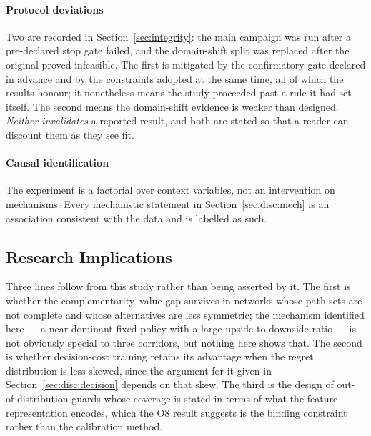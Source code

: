 \paragraph{Protocol deviations} Two are recorded in Section~\ref{sec:integrity}:
the main campaign was run after a pre-declared stop gate failed, and the
domain-shift split was replaced after the original proved infeasible. The first is
mitigated by the confirmatory gate declared in advance and by the constraints
adopted at the same time, all of which the results honour; it nonetheless means
the study proceeded past a rule it had set itself. The second means the
domain-shift evidence is weaker than designed. \emph{Neither invalidates} a
reported result, and both are stated so that a reader can discount them as they
see fit.

\paragraph{Causal identification} The experiment is a factorial over context
variables, not an intervention on mechanisms. Every mechanistic statement in
Section~\ref{sec:disc:mech} is an association consistent with the data and is
labelled as such.

\subsection{Research Implications}
\label{sec:disc:research}

Three lines follow from this study rather than being asserted by it. The first is
whether the complementarity--value gap survives in networks whose path sets are
not complete and whose alternatives are less symmetric; the mechanism identified
here --- a near-dominant fixed policy with a large upside-to-downside ratio --- is
not obviously special to three corridors, but nothing here shows that. The second
is whether decision-cost training retains its advantage when the regret
distribution is less skewed, since the argument for it given in
Section~\ref{sec:disc:decision} depends on that skew. The third is the design of
out-of-distribution guards whose coverage is stated in terms of what the feature
representation encodes, which the O8 result suggests is the binding constraint
rather than the calibration method.
